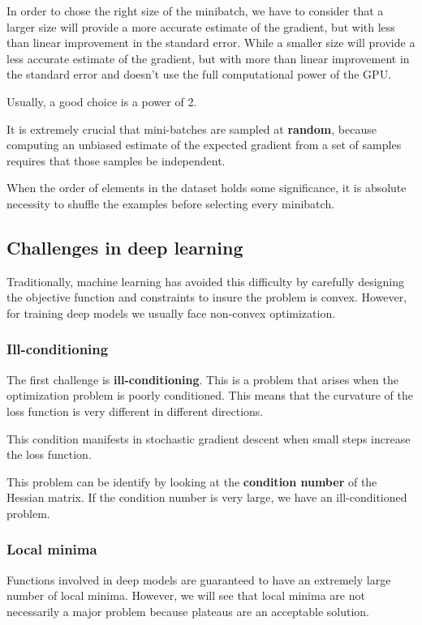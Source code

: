 In order to chose the right size of the minibatch, we have to consider that a
larger size will provide a more accurate estimate of the gradient, but with less
than linear improvement in the standard error. While a smaller size will provide
a less accurate estimate of the gradient, but with more than linear improvement
in the standard error and doesn't use the full computational power of the GPU.

\begin{note}
    Usually, a good choice is a power of 2.
\end{note}

It is extremely crucial that mini-batches are sampled at \textbf{random}, because
computing an unbiased estimate of the expected gradient from a set of samples
requires that those samples be independent.

When the order of elements in the dataset holds some significance, it is absolute
necessity to shuffle the examples before selecting every minibatch.
\subsection{Challenges in deep learning}
Traditionally, machine learning has avoided this difficulty by carefully designing
the objective function and constraints to insure the problem is convex. However,
for training deep models we usually face non-convex optimization.
\subsubsection{Ill-conditioning}
The first challenge is \textbf{ill-conditioning}. This is a problem that arises
when the optimization problem is poorly conditioned. This means that the curvature
of the loss function is very different in different directions.

This condition manifests in stochastic gradient descent when small steps increase
the loss function.

This problem can be identify by looking at the \textbf{condition number} of the
Hessian matrix. If the condition number is very large, we have an ill-conditioned
problem.
\subsubsection{Local minima}
Functions involved in deep models are guaranteed to have an extremely large
number of local minima. However, we will see that local minima are not
necessarily a major problem because plateaus are an acceptable solution.


